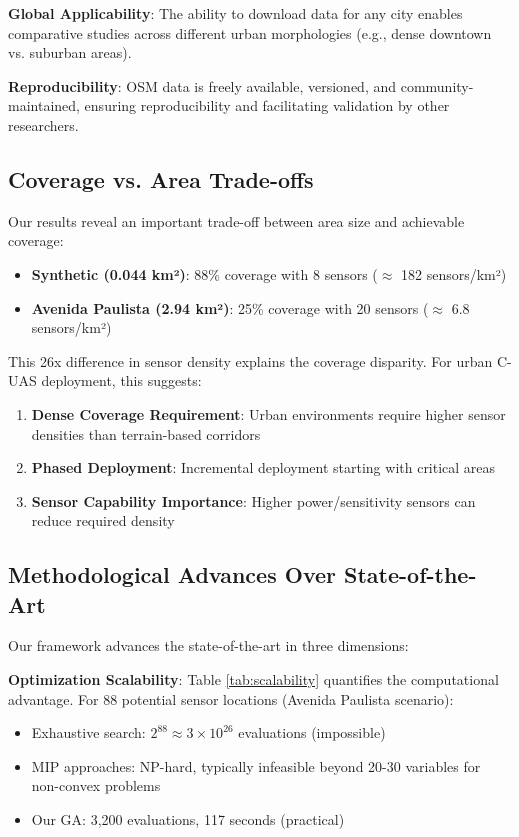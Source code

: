 \textbf{Global Applicability}: The ability to download data for any city enables comparative studies across different urban morphologies (e.g., dense downtown vs. suburban areas).

\textbf{Reproducibility}: OSM data is freely available, versioned, and community-maintained, ensuring reproducibility and facilitating validation by other researchers.

\subsection{Coverage vs. Area Trade-offs}

Our results reveal an important trade-off between area size and achievable coverage:

\begin{itemize}
\item \textbf{Synthetic (0.044 km²)}: 88\% coverage with 8 sensors ($\approx$ 182 sensors/km²)
\item \textbf{Avenida Paulista (2.94 km²)}: 25\% coverage with 20 sensors ($\approx$ 6.8 sensors/km²)
\end{itemize}

This 26x difference in sensor density explains the coverage disparity. For urban C-UAS deployment, this suggests:

\begin{enumerate}
\item \textbf{Dense Coverage Requirement}: Urban environments require higher sensor densities than terrain-based corridors
\item \textbf{Phased Deployment}: Incremental deployment starting with critical areas
\item \textbf{Sensor Capability Importance}: Higher power/sensitivity sensors can reduce required density
\end{enumerate}

\subsection{Methodological Advances Over State-of-the-Art}

Our framework advances the state-of-the-art in three dimensions:

\textbf{Optimization Scalability}: Table \ref{tab:scalability} quantifies the computational advantage. For 88 potential sensor locations (Avenida Paulista scenario):
\begin{itemize}
\item Exhaustive search: $2^{88} \approx 3 \times 10^{26}$ evaluations (impossible)
\item MIP approaches: NP-hard, typically infeasible beyond 20-30 variables for non-convex problems
\item Our GA: 3,200 evaluations, 117 seconds (practical)
\end{itemize}

